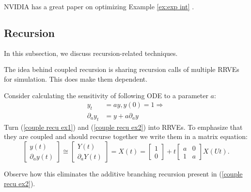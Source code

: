\documentclass[a4paper,12pt]{article}
\begin{document}
\begin{related}
  NVIDIA has a great paper on optimizing Example \ref{ex:exp int}
  \cite{kettunen_unbiased_2021}.
\end{related}

\subsection{Recursion}

In this subsection, we discuss recursion-related techniques.

\begin{technique}
  The idea behind coupled recursion is sharing recursion calls of
  multiple RRVEs for simulation. This does make them dependent.
\end{technique}

\begin{example} \label{ex:coupled recursion}
  Consider calculating the
  sensitivity of following ODE to a
  parameter $a$:
  \begin{align}
    y_t             & =ay,y(0)=1 \Rightarrow \label{couple recu ex1} \\
    \partial_{a}y_t & = y + a \partial_{a}y \label{couple recu ex2}
  \end{align}
  Turn (\ref{couple recu ex1}) and (\ref{couple recu ex2}) into RRVEs.
  To emphasize that they are coupled and should
  recurse together we write them in a matrix equation:
  \begin{equation} \label{coupled mat}
    \begin{bmatrix}
      y(t) \\
      \partial_{a}y(t)
    \end{bmatrix} \cong
    \begin{bmatrix}
      Y(t) \\
      \partial_{a}Y(t)
    \end{bmatrix}=
    X(t)=
    \begin{bmatrix}
      1 \\
      0
    \end{bmatrix}+
    t \begin{bmatrix}
      a & 0 \\
      1 & a
    \end{bmatrix}
    X(Ut).
  \end{equation}


  Observe how this eliminates the additive branching recursion
  present in (\ref{couple recu ex2}).

\end{example}
\end{document}
